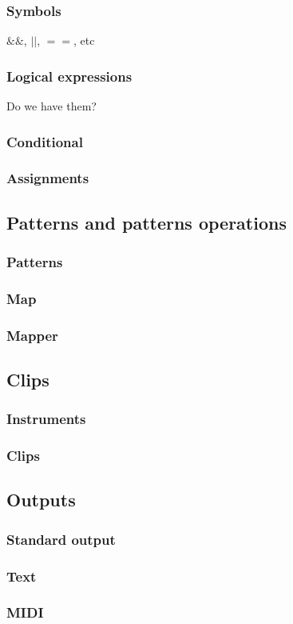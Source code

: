 \documentclass[11pt,twoside]{article}
\begin{document}
\subsubsection{Symbols}
$\&\&$, $||$, $==$, etc


\subsubsection{Logical expressions}
Do we have them?


\subsubsection{Conditional}


\subsubsection{Assignments}

\subsection{Patterns and patterns operations}

\subsubsection{Patterns}

\subsubsection{Map}

\subsubsection{Mapper}

\subsection{Clips}

\subsubsection{Instruments}

\subsubsection{Clips}

\subsection{Outputs}

\subsubsection{Standard output}

\subsubsection{Text}

\subsubsection{MIDI}
\end{document}
